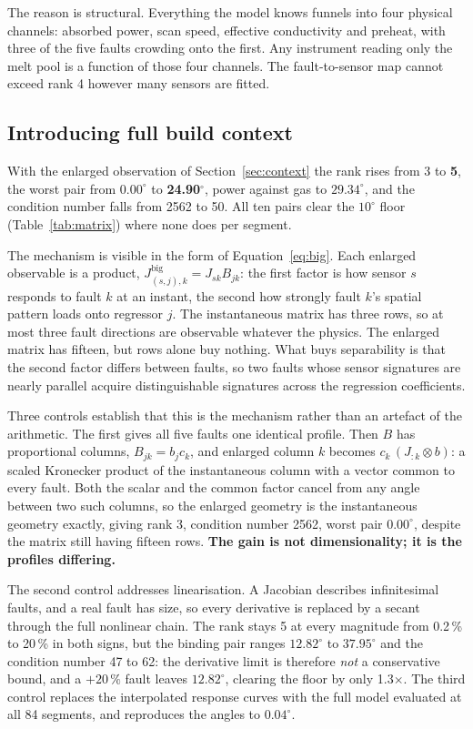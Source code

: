 \documentclass[final,5p,times,twocolumn]{elsarticle}
\begin{document}
The reason is structural. Everything the model knows funnels into four physical
channels: absorbed power, scan speed, effective conductivity and preheat,
with three of the five faults crowding onto the first. Any instrument reading
only the melt pool is a function of those four channels. The fault-to-sensor
map cannot exceed rank 4 however many sensors are fitted.

\subsection{Introducing full build context}

With the enlarged observation of Section~\ref{sec:context} the rank rises from 3
to \textbf{5}, the worst pair from $0.00^\circ$ to \textbf{24.90$^\circ$}, power
against gas to $29.34^\circ$, and the condition number falls from 2562 to 50.
All ten pairs clear the $10^\circ$ floor (Table~\ref{tab:matrix}) where none
does per segment.

The mechanism is visible in the form of Equation~\eqref{eq:big}. Each enlarged
observable is a product, $J^{\mathrm{big}}_{(s,j),k} = J_{sk}B_{jk}$: the first
factor is how sensor $s$ responds to fault $k$ at an instant, the second how
strongly fault $k$'s spatial pattern loads onto regressor $j$. The
instantaneous matrix has three rows, so at most three fault directions are
observable whatever the physics. The enlarged matrix has fifteen, but rows
alone buy nothing. What buys separability is that the second factor differs
between faults, so two faults whose sensor signatures are nearly parallel
acquire distinguishable signatures across the regression coefficients.

Three controls establish that this is the mechanism rather than an artefact of
the arithmetic. The first gives all five faults one identical profile. Then $B$
has proportional columns, $B_{jk}=b_j c_k$, and enlarged column $k$ becomes
$c_k\,(J_{:k}\otimes b)$: a scaled Kronecker product of the instantaneous column
with a vector common to every fault. Both the scalar and the common factor
cancel from any angle between two such columns, so the enlarged geometry is the
instantaneous geometry exactly, giving rank 3, condition number 2562, worst pair
$0.00^\circ$, despite the matrix still having fifteen rows. \textbf{The gain is
not dimensionality; it is the profiles differing.}

The second control addresses linearisation. A Jacobian describes infinitesimal
faults, and a real fault has size, so every derivative is replaced by a secant
through the full nonlinear chain. The rank stays 5 at every magnitude from
0.2\,\% to 20\,\% in both signs, but the binding pair ranges $12.82^\circ$ to
$37.95^\circ$ and the condition number 47 to 62: the derivative limit is
therefore \emph{not} a conservative bound, and a $+20\,\%$ fault leaves
$12.82^\circ$, clearing the floor by only 1.3$\times$. The third control
replaces the interpolated response curves with the full model evaluated at all
84 segments, and reproduces the angles to $0.04^\circ$.
\end{document}
